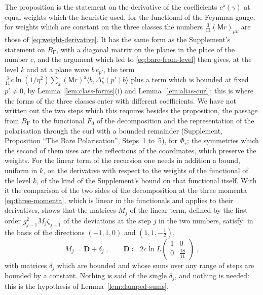 \documentclass[11pt]{preprint}
\numberwithin{equation}{section}
\theoremstyle{definition}
\theoremstyle{remark}
\theoremstyle{plain}
\begin{document}
The proposition is the statement on the derivative of the coefficients $c^{\mathsf a}(\gamma)$ at equal weights which the heuristic used, for the functional of the Feynman gauge; for weights which are constant on the three classes the numbers $\frac{3}{11}(\mathsf Mr)_{\mu\nu}$ are those of \eqref{eq:weight-derivative}. It has the same form as the Supplement's statement on $B_{\mathrm F}$, with a diagonal matrix on the planes in the place of the number $c$, and the argument which led to \eqref{eq:bare-from-level} then gives, at the level $k$ and at a plane wave $b\,e_{p'}$, the term $\frac{3}{11}c\ln(1/\eta^2)\sum_{\mathsf a}(\mathsf Mr)^{\mathsf a}\langle b, \Delta^{\mathsf a}_k(p')b\rangle$ plus a term which is bounded at fixed $p' \neq 0$, by Lemma~\ref{lem:class-forms}(i) and Lemma~\ref{lem:alias-curl}; this is where the forms of the three classes enter with different coefficients. We have not written out the two steps which this requires besides the proposition, the passage from $B_{\mathrm F}$ to the functional $F_0$ of the decomposition and the representation of the polarisation through the curl with a bounded remainder (Supplement, Proposition ``The Bare Polarisation'', Steps~1 to~5), for $\Phi_r$; the symmetries which the second of them uses are the reflections of the coordinates, which preserve the weights. For the linear term of the recursion one needs in addition a bound, uniform in $k$, on the derivative with respect to the weights of the functional of the level $k$, of the kind of the Supplement's bound on that functional itself. With it the comparison of the two sides of the decomposition at the three momenta \eqref{eq:three-momenta}, which is linear in the functionals and applies to their derivatives, shows that the matrices $M_j$ of the linear term, defined by the first order $g_{j-1}^2M_j\zeta_{j-1}$ of the deviations at the step $j$ in the two numbers, satisfy: in the basis of the directions $(-1, 1, 0)$ and $(1, 1, -\frac12)$,
\begin{equation}\label{eq:linear-term-window}
    M_j = \mathbf D + \delta_j\;,
    \qquad
    \mathbf D \coloneqq 2c\ln L\begin{pmatrix} 1 & 0\\ 0 & \frac{18}{11} \end{pmatrix}\;,
\end{equation}
with matrices $\delta_j$ which are bounded and whose sums over any range of steps are bounded by a constant. Nothing is said of the single $\delta_j$, and nothing is needed: this is the hypothesis of Lemma~\ref{lem:damped-sums}.
\end{document}
